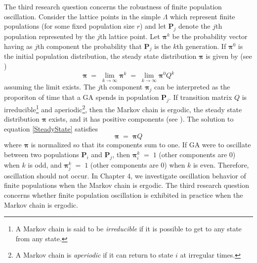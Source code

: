 The third research question concerns the robustness of finite population oscillation.
Consider the lattice points in the simple $\Lambda$ which represent finite populations 
(for some fixed population size $r$) 
and let $\bm{P}_j$ denote the $j$th population represented by the $j$th lattice point. 
Let $\bm{\pi}^k$ be the probability vector having as $j$th component 
the probability that $\bm{P}_j$ is the $k$th generation. 
If $\bm{\pi}^0$ is the initial population distribution, 
the steady state distribution $\bm{\pi}$ is given by (see \cite{MarkovChain})
\begin{equation}
\label{SteadyState}
\bm{\pi} \;=\; \lim_{k \to \infty} \bm{\pi}^k \;=\; \lim_{k \to \infty} \bm{\pi}^0 Q^k
\end{equation}
assuming the limit exists. The $j$th component $\bm{\pi}_j$ can be interpreted 
as the proporiton of time that a GA spends in population $\bm{P}_j$.
If transition matrix $Q$ is irreducible\footnote{A Markov chain is said to be 
{\em irreducible} if it is possible to get to any state from any state.} 
and aperiodic\footnote{A Markov chain is {\em aperiodic} if it can return to 
state $i$ at irregular times.}, then the Markov chain is 
ergodic, the steady state distribution $\bm{\pi}$ exists, and it has positive components 
(see \cite{Minc1988}). 
The solution to equation \ref{SteadyState} satisfies
\begin{equation}
\label{SteadyStateSolution}
\bm{\pi} \; = \; \bm{\pi} Q
\end{equation}
where $\bm{\pi}$ is normalized so that its components sum to one.
If GA were to oscillate between two populations $\bm{P}_i$ and $\bm{P}_j$, then 
$\bm{\pi}^k_i \;=\; 1$ (other components are $0$) when $k$ is odd, 
and $\bm{\pi}^k_j \;=\; 1$ (other components are $0$) when $k$ is even. 
Therefore, oscillation should not occur. In Chapter 4, we investigate oscillation behavior of 
finite populations when the Markov chain is ergodic. The third research question concerns whether 
finite population oscillation is exhibited in practice when the Markov chain is ergodic.



